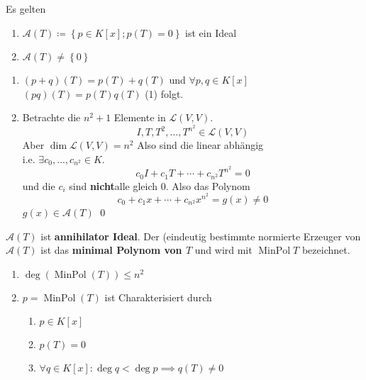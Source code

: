 \begin{subproposition}
	Es gelten
	\begin{enumerate}[label=(\arabic*)]
		\item $ \mathcal{A} (T) \coloneqq  \left\{ p \in K[x]; p(T) = 0 \right\}  $ ist ein Ideal
		\item $ \mathcal{A} (T) \neq \left\{ 0 \right\}  $
	\end{enumerate}
\end{subproposition}
\begin{subproof*}
	\begin{enumerate}[label=(\arabic*)]
		\item $ ( p + q ) (T) = p(T) + q(T) $ und $ \forall p, q \in K[x] $ $ (pq) (T) = p(T) q(T) $ (1) folgt.
		\item Betrachte die $ n^2 + 1 $ Elemente in $ \mathcal{L} \left( V, V \right)  $.
			\[
				I, T, T^2, \dotsc, T^{n^2} \in \mathcal{L} (V, V)
			\]
			Aber $ \dim \mathcal{L} (V, V) = n^2 $ Also sind die linear abhängig\\
			i.e. $ \exists c_0, \dotsc, c_{n^2} \in K $.
			\[
				c_0I + c_1T + \dotsb + c_{n^2} T^{n^2} = 0
			\]
			und die $ c_i $ sind \textbf{nicht}alle gleich 0.
			Also das Polynom
			\[
				c_0 + c_1x + \dotsb + c_{n^2} x^{n^2} = g(x) \neq 0
			\]
			$ g(x) \in \mathcal{A} (T) $ \qed
	\end{enumerate}
\end{subproof*}

\begin{subdefinition}
	$ \mathcal{A} (T) $ ist \textbf{annihilator Ideal}.
	Der (eindeutig bestimmte normierte Erzeuger von
	$ \mathcal{A} (T) $ 
	ist das \textbf{minimal Polynom von $ T $} und wird mit $ \operatorname{Min Pol} T $ bezeichnet.
\end{subdefinition}

\begin{subnote}
	\begin{enumerate}[label=(\arabic*)]
		\item $ \deg (\operatorname{Min Pol}(T)) \leq  n^2 $
		\item $ p = \operatorname{Min Pol}(T) $ ist Charakterisiert durch
			\begin{enumerate}[label=(\alph*)]
				\item $ p \in K[x] $ 
				\item $ p(T) = 0 $ 
				\item $ \forall q \in K[x] : \deg q < \deg p \implies q(T) \neq 0  $
			\end{enumerate}
	\end{enumerate}
\end{subnote}

